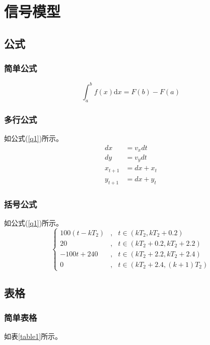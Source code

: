 \documentclass{nwputhesis}
\begin{document}
\section{信号模型}
\subsection{公式}
\subsubsection{简单公式}
\begin{equation}
    \int_a^b f(x)\mathrm{d}x=F(b)-F(a)
\end{equation}

\subsubsection{多行公式}
如公式(\ref{q1})所示。
\begin{equation}
    \label{q1}
    \begin{aligned}
        dx      & =v_{x}dt  \\
        dy      & =v_{y}dt  \\
        x_{t+1} & =dx+x_{t} \\
        y_{t+1} & =dx+y_{t}
    \end{aligned}
\end{equation}

\subsubsection{括号公式}
如公式(\ref{q1})所示。
\begin{equation}
    \left\{
    \begin{aligned}
        100(t-kT_{2}) & , & t\in (kT_{2}, kT_{2}+0.2 )    \\
        20            & , & t\in (kT_{2}+0.2,kT_{2}+2.2)  \\
        -100t+240     & , & t\in( kT_{2}+2.2, kT_{2}+2.4) \\
        0             & , & t\in (kT_{2}+2.4,(k+1)T_{2})
    \end{aligned}
    \right.
\end{equation}

\subsection{表格}
\subsubsection{简单表格}
如表\ref{table1}所示。
\end{document}
